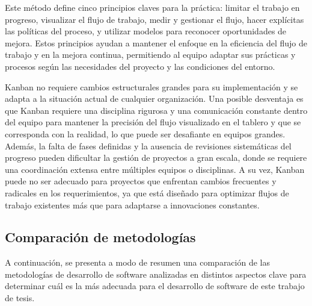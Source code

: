 \documentclass[main.tex]{subfiles}
\begin{document}
Este método define cinco principios claves para la práctica: limitar el trabajo en progreso, visualizar el flujo de trabajo, medir y gestionar el flujo, hacer explícitas las políticas del proceso, y utilizar modelos para reconocer oportunidades de mejora. Estos principios ayudan a mantener el enfoque en la eficiencia del flujo de trabajo y en la mejora continua, permitiendo al equipo adaptar sus prácticas y procesos según las necesidades del proyecto y las condiciones del entorno.

Kanban no requiere cambios estructurales grandes para su implementación y se adapta a la situación actual de cualquier organización. Una posible desventaja es que Kanban requiere una disciplina rigurosa y una comunicación constante dentro del equipo para mantener la precisión del flujo visualizado en el tablero y que se corresponda con la realidad, lo que puede ser desafiante en equipos grandes. Además, la falta de fases definidas y la ausencia de revisiones sistemáticas del progreso pueden dificultar la gestión de proyectos a gran escala, donde se requiere una coordinación extensa entre múltiples equipos o disciplinas. A su vez, Kanban puede no ser adecuado para proyectos que enfrentan cambios frecuentes y radicales en los requerimientos, ya que está diseñado para optimizar flujos de trabajo existentes más que para adaptarse a innovaciones constantes.

\subsection{Comparación de metodologías}

A continuación, se presenta a modo de resumen una comparación de las metodologías de desarrollo de software analizadas en distintos aspectos clave para determinar cuál es la más adecuada para el desarrollo de software de este trabajo de tesis.
\end{document}
